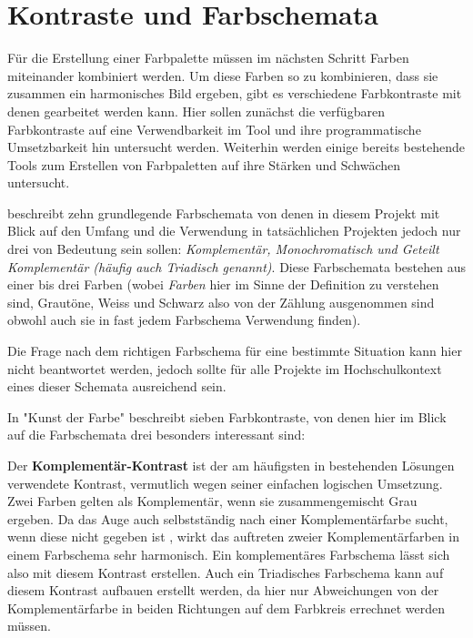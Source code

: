 
\section{Kontraste und Farbschemata}

Für die Erstellung einer Farbpalette müssen im nächsten Schritt Farben miteinander kombiniert werden. Um diese Farben so zu kombinieren, dass sie zusammen ein harmonisches Bild ergeben, gibt es verschiedene Farbkontraste mit denen gearbeitet werden kann.
Hier sollen zunächst die verfügbaren Farbkontraste auf eine Verwendbarkeit im Tool und ihre programmatische Umsetzbarkeit hin untersucht werden.
Weiterhin werden einige bereits bestehende Tools zum Erstellen von Farbpaletten auf ihre Stärken und Schwächen untersucht.

\cite[S.22]{whelan1994color} beschreibt zehn grundlegende Farbschemata von denen in diesem Projekt mit Blick auf den Umfang und die Verwendung in tatsächlichen Projekten jedoch nur drei von Bedeutung sein sollen: \textit{Komplementär, Monochromatisch} \textit{und Geteilt Komplementär (häufig auch Triadisch genannt)}.
Diese Farbschemata bestehen aus einer bis drei Farben (wobei \textit{Farben} hier im Sinne der Definition zu verstehen sind, Grautöne, Weiss und Schwarz also von der Zählung ausgenommen sind obwohl auch sie in fast jedem Farbschema Verwendung finden).

Die Frage nach dem richtigen Farbschema für eine bestimmte Situation kann hier nicht beantwortet werden, jedoch sollte für alle Projekte im Hochschulkontext eines dieser Schemata ausreichend sein.

In "Kunst der Farbe" beschreibt \cite{Itten201006} sieben Farbkontraste, von denen hier im Blick auf die Farbschemata drei besonders interessant sind:

Der \textbf{Komplementär-Kontrast} ist der am häufigsten in bestehenden Lösungen verwendete Kontrast, vermutlich wegen seiner einfachen logischen Umsetzung. Zwei Farben gelten als Komplementär, wenn sie zusammengemischt Grau ergeben.
Da das Auge auch selbstständig nach einer Komplementärfarbe sucht, wenn diese nicht gegeben ist \cite[S. 49]{Itten201006}, wirkt das auftreten zweier Komplementärfarben in einem Farbschema sehr harmonisch.
Ein komplementäres Farbschema lässt sich also mit diesem Kontrast erstellen. Auch ein Triadisches Farbschema kann auf diesem Kontrast aufbauen erstellt werden, da hier nur Abweichungen von der Komplementärfarbe in beiden Richtungen auf dem Farbkreis errechnet werden müssen.

